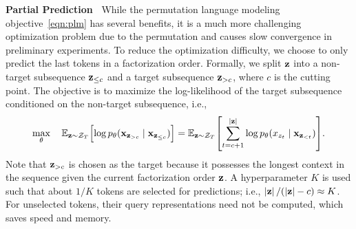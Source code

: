

\textbf{Partial Prediction~}
While the permutation language modeling objective~\eqref{eqn:plm} has several benefits, it is a much more challenging optimization problem due to the permutation and causes slow convergence in preliminary experiments. To reduce the optimization difficulty, we choose to only predict the last tokens in a factorization order. Formally, we split ${\mathbf{z}}$ into a non-target subsequence ${\mathbf{z}}_{\leq c}$ and a target subsequence ${\mathbf{z}}_{> c}$, where $c$ is the cutting point. The objective is to maximize the log-likelihood of the target subsequence conditioned on the non-target subsequence, i.e.,
\begin{equation}
\max_{\theta}\quad \mbb{E}_{\rvz \sim \mc{Z}_T} \sbr[\Big]{ \log p_\theta(\rvx_{\rvz_{> c}} \mid \rvx_{\rvz_{\leq c}}) }
= \mbb{E}_{\rvz \sim \mc{Z}_T} \sbr{ \sum_{t=c + 1}^{\abs{\rvz}} \log p_\theta(x_{z_t} \mid \rvx_{\rvz_{<t}}) }.
\label{eqn:partial-plm}
\end{equation}
Note that ${\mathbf{z}}_{> c}$ is chosen as the target because it possesses the longest context in the sequence given the current factorization order ${\mathbf{z}}$.
A hyperparameter $K$ is used such that about $1/K$ tokens are selected for predictions; i.e., $\left| {{\mathbf{z}}} \right| / (\left| {{\mathbf{z}}} \right| - c) \approx K$. For unselected tokens, their query representations need not be computed, which saves speed and memory.

